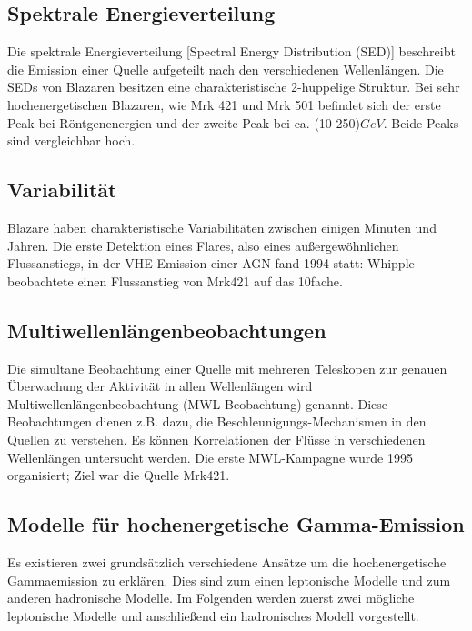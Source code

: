 \subsection{Spektrale Energieverteilung}
Die spektrale Energieverteilung [Spectral Energy Distribution (SED)] beschreibt die Emission einer Quelle aufgeteilt nach den verschiedenen Wellenlängen.
Die SEDs von Blazaren besitzen eine charakteristische 2-huppelige Struktur.
Bei sehr hochenergetischen Blazaren, wie Mrk 421 und Mrk 501 befindet sich der erste Peak bei Röntgenenergien und der zweite Peak bei ca. (10-250)$\si{GeV}$.
Beide Peaks sind vergleichbar hoch.\cite{Weekes}


\subsection{Variabilität}
Blazare haben charakteristische Variabilitäten zwischen einigen Minuten und Jahren.
Die erste Detektion eines Flares, also eines außergewöhnlichen Flussanstiegs, in der VHE-Emission einer AGN fand 1994 statt:
Whipple beobachtete einen Flussanstieg von Mrk421 auf das 10fache.\cite{Weekes}\cite{Mrk421_Outburst}

\subsection{Multiwellenlängenbeobachtungen}
Die simultane Beobachtung einer Quelle mit mehreren Teleskopen zur genauen Überwachung der Aktivität in allen Wellenlängen wird Multiwellenlängenbeobachtung (MWL-Beobachtung) genannt. 
Diese Beobachtungen dienen z.B. dazu, die Beschleunigungs-Mechanismen in den Quellen zu verstehen.
Es können Korrelationen der Flüsse in verschiedenen Wellenlängen untersucht werden.
Die erste MWL-Kampagne wurde 1995 organisiert; Ziel war die Quelle Mrk421.\cite{Weekes}

\subsection{Modelle für hochenergetische Gamma-Emission}
Es existieren zwei grundsätzlich verschiedene Ansätze um die hochenergetische Gammaemission zu erklären.
Dies sind zum einen leptonische Modelle und zum anderen hadronische Modelle.
Im Folgenden werden zuerst zwei mögliche leptonische Modelle und anschließend ein hadronisches Modell vorgestellt.

